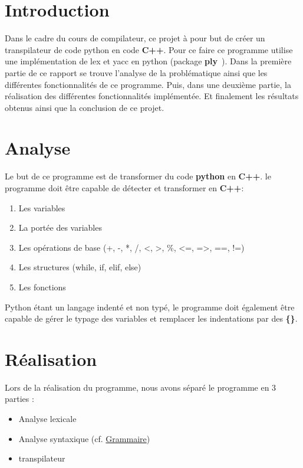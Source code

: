 \tableofcontents

\clearpage
{} %
\chapter{Introduction}

Dans le cadre du cours de compilateur, ce projet à pour but de créer un transpilateur de code python en code \textbf{C++}.
Pour ce faire ce programme utilise une implémentation de lex et yacc en python (package \textbf{ply}~\cite{ply}).
Dans la première partie de ce rapport se trouve l'analyse de la problématique ainsi que les différentes fonctionnalités de ce programme.
Puis, dans une deuxième partie, la réalisation des différentes fonctionnalités implémentée.
Et finalement les résultats obtenus ainsi que la conclusion de ce projet.
\chapter{Analyse}

Le but de ce programme est de transformer du code \textbf{python} en \textbf{C++}.
le programme doit être capable de détecter et transformer en \textbf{C++}:
\begin{enumerate}
    \item Les variables
    \item La portée des variables
    \item Les opérations de base (+, -, *, /, <, >, \%, <=, =>, ==, !=)
    \item Les structures (while, if, elif, else)
    \item Les fonctions
\end{enumerate}

Python étant un langage indenté et non typé, le programme doit également être capable de gérer
le typage des variables et remplacer les indentations par des \textbf{\{\}}.

\chapter{Réalisation}

Lors de la réalisation du programme, nous avons séparé le programme en 3 parties :

\begin{itemize}
    \item Analyse lexicale
    \item Analyse syntaxique (cf. \hyperref[annexe:grammar]{Grammaire})
    \item transpilateur
\end{itemize}

